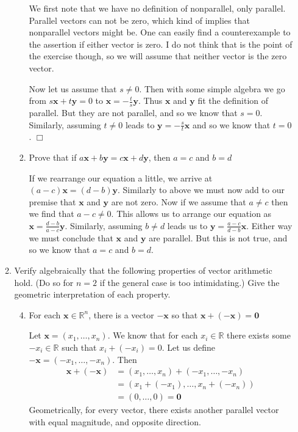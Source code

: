 \documentclass[letterpaper]{article}
\begin{document}
\begin{enumerate}
\begin{enumerate}
\begin{enumerate}
    We first note that we have no definition of nonparallel, only parallel. Parallel vectors can not be zero, which kind of implies that nonparallel vectors might be. One can easily find a counterexample to the assertion if either vector is zero. I do not think that is the point of the exercise though, so we will assume that neither vector is the zero vector.

    Now let us assume that $s\ne0$. Then with some simple algebra we go from $s\mathbf{x}+t\mathbf{y}=0$ to $\mathbf{x}=-\frac{t}{s}\mathbf{y}$. Thus $\mathbf{x}$ and $\mathbf{y}$ fit the definition of parallel. But they are not parallel, and so we know that $s=0$. Similarly, assuming $t\ne 0$ leads to $\mathbf{y}=-\frac{s}{t}\mathbf{x}$ and so we know that $t=0$. $\Box$
    \item
    Prove that if $a\mathbf{x}+b\mathbf{y}=c\mathbf{x}+d\mathbf{y}$, then $a=c$ and $b=d$

    If we rearrange our equation a little, we arrive at $(a-c)\mathbf{x}=(d-b)\mathbf{y}$. Similarly to above we must now add to our premise that $\mathbf{x}$ and $\mathbf{y}$ are not zero. Now if we assume that $a\ne c$ then we find that $a-c\ne 0$. This allows us to arrange our equation as $\mathbf{x}=\frac{d-b}{a-c}\mathbf{y}$. Similarly, assuming $b\ne d$ leads us to $\mathbf{y}=\frac{a-c}{d-b}\mathbf{x}$. Either way we must conclude that $\mathbf{x}$ and $\mathbf{y}$ are parallel. But this is not true, and so we know that $a=c$ and $b=d$.
    \end{enumerate}
  \setcounter{enumii}{27}
  \item
  Verify algebraically that the following properties of vector arithmetic hold. (Do so for $n=2$ if the general case is too intimidating.) Give the geometric interpretation of each property.
    \begin{enumerate}
    \setcounter{enumiii}{3}
    \item
    For each $\mathbf{x}\in \mathbb{R}^n$, there is a vector $-\mathbf{x}$ so that $\mathbf{x}+(-\mathbf{x})=\mathbf{0}$

    Let $\mathbf{x}=(x_1,\dots,x_n)$. We know that for each $x_i\in \mathbb{R}$ there exists some $-x_i\in \mathbb{R}$ such that $x_i+(-x_i)=0$. Let us define $-\mathbf{x}=(-x_1,\dots,-x_n)$. Then
    \begin{align*}
      \mathbf{x}+(-\mathbf{x})&=(x_1,\dots,x_n)+(-x_1,\dots,-x_n)\\
      &=(x_1+(-x_1),\dots,x_n+(-x_n))\\
      &=(0,\dots,0)=\mathbf{0}
    \end{align*}
    Geometrically, for every vector, there exists another parallel vector with equal magnitude, and opposite direction.
    \end{enumerate}
  \end{enumerate}
\end{enumerate}
\end{document}
